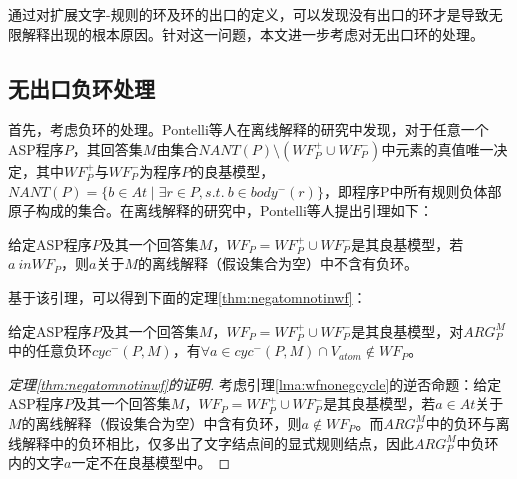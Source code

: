 通过对扩展文字-规则的环及环的出口的定义，可以发现没有出口的环才是导致无限解释出现的根本原因。针对这一问题，本文进一步考虑对无出口环的处理。
\subsection{无出口负环处理}
首先，考虑负环的处理。Pontelli等人在离线解释的研究中发现，对于任意一个ASP程序$P$，其回答集$M$由集合$NANT(P) \setminus (WF^+_P \cup WF^-_P)$中元素的真值唯一决定\cite{pontelli2006justifications}，其中$WF^+_P$与$WF^-_P$为程序$P$的良基模型，$NANT(P)=\{b \in At \mid \exists r \in P, s.t.\ b \in body^-(r)\}$，即程序P中所有规则负体部原子构成的集合。在离线解释的研究中，Pontelli等人提出引理如下\cite{pontelli2009justifications}：
\begin{lemma}
    \label{lma:wfnonegcycle}
    给定ASP程序$P$及其一个回答集$M$，$WF_P=WF^+_P \cup WF^-_P$是其良基模型，若$a \ in WF_P$，则$a$关于$M$的离线解释（假设集合为空）中不含有负环。
\end{lemma}

基于该引理，可以得到下面的定理\ref{thm:negatomnotinwf}：%
\begin{theorem}[负环原子不在良基模型中]
    \label{thm:negatomnotinwf}
    给定ASP程序$P$及其一个回答集$M$，$WF_P=WF^+_P \cup WF^-_P$是其良基模型，对$ARG^M_P$中的任意负环$cyc^-(P, M)$，有$\forall a \in cyc^-(P, M) \cap V_{atom} \notin WF_P$。
\end{theorem}

\begin{proof}[定理\ref{thm:negatomnotinwf}的证明]
    考虑引理\ref{lma:wfnonegcycle}的逆否命题：给定ASP程序$P$及其一个回答集$M$，$WF_P=WF^+_P \cup WF^-_P$是其良基模型，若$a \in At$关于$M$的离线解释（假设集合为空）中含有负环，则$a \notin WF_P$。而$ARG^M_P$中的负环与离线解释中的负环相比，仅多出了文字结点间的显式规则结点，因此$ARG^M_P$中负环内的文字$a$一定不在良基模型中。
\end{proof}

